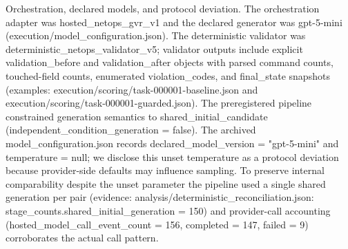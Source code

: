 \documentclass[conference]{IEEEtran}
\begin{document}
Orchestration, declared models, and protocol deviation. The orchestration adapter was hosted\_netops\_gvr\_v1 and the declared generator was gpt-5-mini (execution/model\_configuration.json). The deterministic validator was deterministic\_netops\_validator\_v5; validator outputs include explicit validation\_before and validation\_after objects with parsed command counts, touched-field counts, enumerated violation\_codes, and final\_state snapshots (examples: execution/scoring/task-000001-baseline.json and execution/scoring/task-000001-guarded.json). The preregistered pipeline constrained generation semantics to shared\_initial\_candidate (independent\_condition\_generation = false). The archived model\_configuration.json records declared\_model\_version = "gpt-5-mini" and temperature = null; we disclose this unset temperature as a protocol deviation because provider-side defaults may influence sampling. To preserve internal comparability despite the unset parameter the pipeline used a single shared generation per pair (evidence: analysis/deterministic\_reconciliation.json: stage\_counts.shared\_initial\_generation = 150) and provider-call accounting (hosted\_model\_call\_event\_count = 156, completed = 147, failed = 9) corroborates the actual call pattern.
\end{document}
